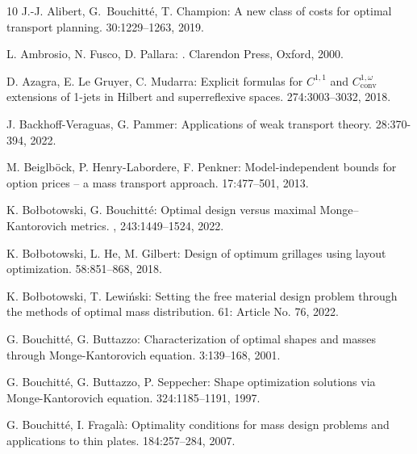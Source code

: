 \documentclass[11pt,letterpaper,reqno]{amsart}
\theoremstyle{definition}
\numberwithin{equation}{section}
\begin{document}
{\begin{thebibliography}{10}
	J.-J. Alibert, G.~Bouchitt\'e,  T. Champion:
	\newblock A new class of costs for optimal transport planning.
	 30:1229--1263, 2019.
	
	L. Ambrosio, N. Fusco, D. Pallara: 
	.
	\newblock Clarendon Press, Oxford, 2000.
	
	D. Azagra, E. Le Gruyer, C. Mudarra:
	\newblock Explicit formulas for $C^{1,1}$ and $C^{1,\omega}_{\mathrm{conv}}$ extensions of 1-jets
	in {H}ilbert and superreflexive spaces.
	 274:3003--3032, 2018.
	
	J. Backhoff-Veraguas, G. Pammer:
	\newblock Applications of weak transport theory.
	 28:370-394, 2022.

	M. Beiglb{\"o}ck, P. Henry-Labordere, F. Penkner:
	\newblock Model-independent bounds for option prices -- a mass transport
	approach.
	 17:477--501, 2013.
	
	K. Bo{\l}botowski, G. Bouchitt{\'e}:
	\newblock Optimal design versus maximal Monge--Kantorovich metrics.
	, 243:1449--1524,
	2022.
	
	K. Bo{\l}botowski, L. He, M. Gilbert:
	\newblock Design of optimum grillages using layout optimization.
	 58:851--868, 2018.

	K. Bo{\l}botowski, T. Lewi{\'n}ski: 
    \newblock Setting the free material design
	problem through the methods of optimal mass distribution.  61: Article No. 76, 2022.
	
	G. Bouchitt{\'e}, G. Buttazzo:
	\newblock Characterization of optimal shapes and masses through
	{M}onge-{K}antorovich equation.
	 3:139--168, 2001.
	
	G. Bouchitt\'e, G. Buttazzo, P. Seppecher:
	\newblock Shape optimization solutions via {M}onge-{K}antorovich equation.
	 324:1185--1191,
	1997.
	
	G. Bouchitt{\'e}, I. Fragal{\`a}:
	\newblock Optimality conditions for mass design problems and applications to
	thin plates.
	 184:257--284,
	2007.
	

\end{thebibliography}}
\end{document}

